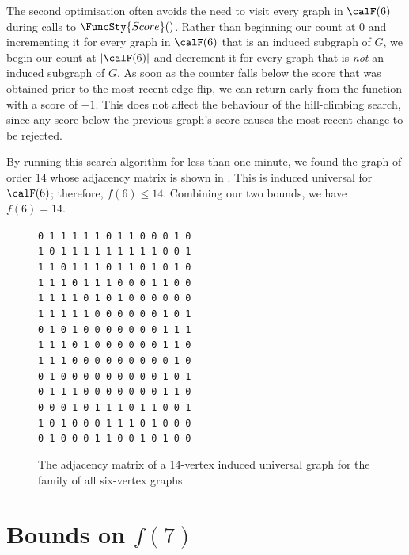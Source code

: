 The second optimisation often avoids the need to visit every graph in $\calF(6)$
during calls to $\FuncSty{Score}()$.  Rather than beginning our count at 0
and incrementing it for every graph in $\calF(6)$ that is an induced subgraph
of $G$, we begin our count at $|\calF(6)|$ and decrement it for every
graph that is \emph{not} an induced subgraph of $G$.
As soon as the counter
falls below the score that was obtained prior to the most recent edge-flip,
we can return early from the function with a score of $-1$.
This does not affect the behaviour of the hill-climbing search, since any
score below the previous graph's score causes the most recent change
to be rejected.

By running this search algorithm for less than one minute, we found the graph of
order 14 whose adjacency matrix is shown in .  This is induced
universal for $\calF(6)$; therefore, $f(6) \leq 14$.  Combining our two bounds, we
have $f(6) = 14$.

\begin{figure}[htb]
\centering
\scriptsize
\verb|0 1 1 1 1 1 0 1 1 0 0 0 1 0| \\
\verb|1 0 1 1 1 1 1 1 1 1 1 0 0 1| \\
\verb|1 1 0 1 1 1 0 1 1 0 1 0 1 0| \\
\verb|1 1 1 0 1 1 1 0 0 0 1 1 0 0| \\
\verb|1 1 1 1 0 1 0 1 0 0 0 0 0 0| \\
\verb|1 1 1 1 1 0 0 0 0 0 0 1 0 1| \\
\verb|0 1 0 1 0 0 0 0 0 0 0 1 1 1| \\
\verb|1 1 1 0 1 0 0 0 0 0 0 1 1 0| \\
\verb|1 1 1 0 0 0 0 0 0 0 0 0 1 0| \\
\verb|0 1 0 0 0 0 0 0 0 0 0 1 0 1| \\
\verb|0 1 1 1 0 0 0 0 0 0 0 1 1 0| \\
\verb|0 0 0 1 0 1 1 1 0 1 1 0 0 1| \\
\verb|1 0 1 0 0 0 1 1 1 0 1 0 0 0| \\
\verb|0 1 0 0 0 1 1 0 0 1 0 1 0 0|
\caption{The adjacency matrix of a 14-vertex induced universal graph for the family of all
six-vertex graphs}
\label{fig:adjmat14}
\end{figure}

\section{Bounds on \texorpdfstring{$f(7)$}{f(7)}}\label{sec:f7}

